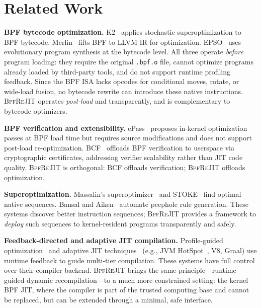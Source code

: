 \documentclass[sigconf,anonymous]{acmart}
\begin{document}
\section{Related Work}
\label{sec:related}

\textbf{BPF bytecode optimization.}
K2~\cite{k2} applies stochastic superoptimization to BPF bytecode.
Merlin~\cite{merlin} lifts BPF to LLVM IR for optimization.
EPSO~\cite{epso} uses evolutionary program synthesis at the bytecode
level. All three operate \emph{before} program loading: they require
the original \texttt{.bpf.o} file, cannot optimize programs already
loaded by third-party tools, and do not support runtime profiling
feedback. Since the BPF ISA lacks opcodes for conditional moves,
rotate, or wide-load fusion, no bytecode rewrite can introduce these
native instructions. \textsc{BpfReJIT} operates \emph{post-load} and
transparently, and is complementary to bytecode optimizers.

\textbf{BPF verification and extensibility.}
ePass~\cite{epass} proposes in-kernel optimization passes at BPF load
time but requires source modifications and does not support post-load
re-optimization. BCF~\cite{bcf} offloads BPF verification to userspace
via cryptographic certificates, addressing verifier scalability rather
than JIT code quality. \textsc{BpfReJIT} is orthogonal: BCF offloads
verification; \textsc{BpfReJIT} offloads optimization.

\textbf{Superoptimization.}
Massalin's superoptimizer~\cite{superoptimizer} and
STOKE~\cite{stoke} find optimal native sequences.
Bansal and Aiken~\cite{credal} automate peephole rule generation.
These systems discover better instruction sequences;
\textsc{BpfReJIT} provides a framework to \emph{deploy} such
sequences to kernel-resident programs transparently and safely.

\textbf{Feedback-directed and adaptive JIT compilation.}
Profile-guided optimization~\cite{feedback_directed} and adaptive JIT
techniques~\cite{jit_survey} (e.g., JVM HotSpot~\cite{jvm_hotspot},
V8, Graal) use runtime feedback to guide multi-tier compilation. These
systems have full control over their compiler backend.
\textsc{BpfReJIT} brings the same principle---runtime-guided dynamic
recompilation---to a much more constrained setting: the kernel BPF JIT,
where the compiler is part of the trusted computing base and cannot be
replaced, but can be extended through a minimal, safe interface.
\end{document}
